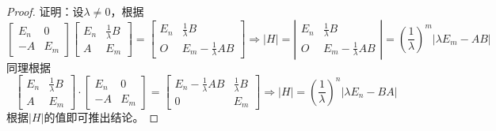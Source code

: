 \begin{proof}
  证明：设$\lambda \neq 0$，根据
  \begin{equation*}
    \left[
      \begin{array}{cc}
        E_n&0\\
        -A&E_m
      \end{array}
    \right] \left[
      \begin{array}{cc}
        E_n&\frac{1}{\lambda}B\\
        A&E_m
      \end{array}
    \right] = \left[
      \begin{array}{cc}
        E_n&\frac{1}{\lambda}B\\
        O&E_m - \frac{1}{\lambda}AB
      \end{array}
    \right] \Rightarrow |H| = \left|
      \begin{array}{cc}
        E_n&\frac{1}{\lambda}B\\
        O&E_m - \frac{1}{\lambda}AB
      \end{array}
    \right| = \left( \frac{1}{\lambda} \right)^m |\lambda E_m - AB|
  \end{equation*}
  同理根据
  \begin{equation*}
    \left[\begin{array}{cc}
            E_{n} & \frac{1}{\lambda} B \\
            A & E_{m}
          \end{array}\right] \cdot\left[\begin{array}{cc}
                                          E_{n} & 0 \\
                                          -A & E_{m}
                                        \end{array}\right]=\left[\begin{array}{cc}
                                                                   E_{n}-\frac{1}{\lambda} A B & \frac{1}{\lambda} B \\
                                                                   0 & E_{m}
                                                                 \end{array}\right] \Rightarrow |H| = \left( \frac{1}{\lambda} \right)^n |\lambda E_n - BA|
  \end{equation*}
  根据$|H|$的值即可推出结论。
\end{proof}

~


